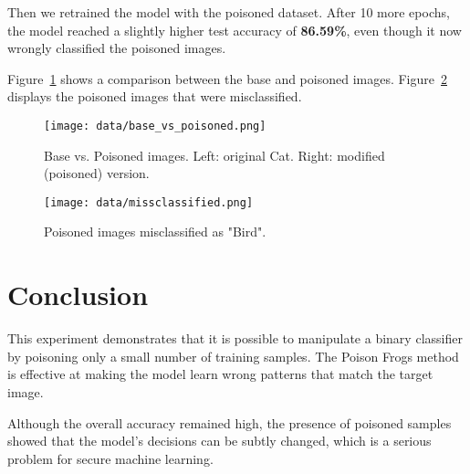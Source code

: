 \documentclass{article}
\begin{document}
Then we retrained the model with the poisoned dataset. After 10 more epochs, the model reached a slightly higher test accuracy of \textbf{86.59\%}, even though it now wrongly classified the poisoned images.

Figure~\ref{fig:poisoned} shows a comparison between the base and poisoned images. Figure~\ref{fig:misclassified} displays the poisoned images that were misclassified.

\begin{figure}[h]
    \centering
    \texttt{[image: data/base\_vs\_poisoned.png]}
    \caption{Base vs. Poisoned images. Left: original Cat. Right: modified (poisoned) version.}
    \label{fig:poisoned}
\end{figure}

\begin{figure}[h]
    \centering
    \texttt{[image: data/missclassified.png]}
    \caption{Poisoned images misclassified as "Bird".}
    \label{fig:misclassified}
\end{figure}

\section{Conclusion}
This experiment demonstrates that it is possible to manipulate a binary classifier by poisoning only a small number of training samples. The Poison Frogs method is effective at making the model learn wrong patterns that match the target image.

Although the overall accuracy remained high, the presence of poisoned samples showed that the model's decisions can be subtly changed, which is a serious problem for secure machine learning.
\end{document}
